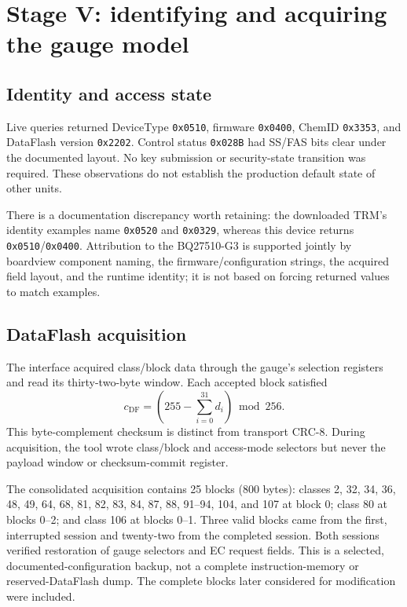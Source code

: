 \documentclass[11pt,a4paper]{article}
\newcommand{\hex}[1]{\texttt{0x#1}}
\newcommand{\code}[1]{\texttt{\detokenize{#1}}}
\begin{document}
\section{Stage V: identifying and acquiring the gauge model}
\subsection{Identity and access state}
Live \code{Control()} queries returned DeviceType \hex{0510}, firmware \hex{0400}, ChemID \hex{3353}, and DataFlash version \hex{2202}. Control status \hex{028B} had SS/FAS bits clear under the documented layout. No key submission or security-state transition was required. These observations do not establish the production default state of other units.

There is a documentation discrepancy worth retaining: the downloaded TRM's identity examples name \hex{0520} and \hex{0329}, whereas this device returns \hex{0510}/\hex{0400}. Attribution to the BQ27510-G3 is supported jointly by boardview component naming, the firmware/configuration strings, the acquired field layout, and the runtime identity; it is not based on forcing returned values to match examples.

\subsection{DataFlash acquisition}
The interface acquired class/block data through the gauge's selection registers and read its thirty-two-byte window. Each accepted block satisfied
\begin{equation}
 c_{\mathrm{DF}}=(255-\sum_{i=0}^{31}d_i)\bmod256.
\end{equation}
This byte-complement checksum is distinct from transport CRC-8. During acquisition, the tool wrote class/block and access-mode selectors but never the payload window or checksum-commit register.

The consolidated acquisition contains 25 blocks (800 bytes): classes 2, 32, 34, 36, 48, 49, 64, 68, 81, 82, 83, 84, 87, 88, 91--94, 104, and 107 at block 0; class 80 at blocks 0--2; and class 106 at blocks 0--1. Three valid blocks came from the first, interrupted session and twenty-two from the completed session. Both sessions verified restoration of gauge selectors and EC request fields. This is a selected, documented-configuration backup, not a complete instruction-memory or reserved-DataFlash dump. The complete blocks later considered for modification were included.
\end{document}
